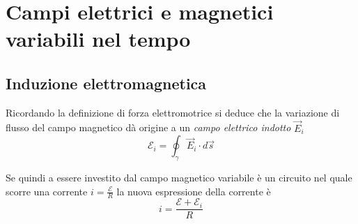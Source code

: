 \documentclass[x11names]{report}
\begin{document}
\section{Campi elettrici e magnetici variabili nel tempo}
\subsection{Induzione elettromagnetica}
Ricordando la definizione di forza elettromotrice si deduce che la variazione di flusso del campo magnetico dà origine a un \textit{campo elettrico indotto} \(\vec{E}_i\)
\[
\mathcal{E}_i = \oint_\gamma \vec{E}_i \cdot d\vec{s}
\]

Se quindi a essere investito dal campo magnetico variabile è un circuito nel quale scorre una corrente \(i = \frac{\mathcal{E}}{R}\) la nuova espressione della corrente è 
\[
i = \frac{\mathcal{E} + \mathcal{E}_i}{R}
\]
\end{document}

